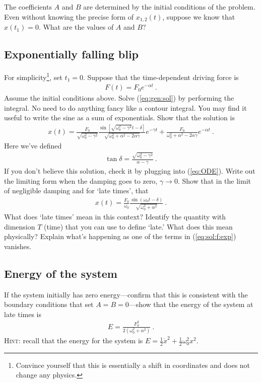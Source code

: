 \documentclass[12pt]{article}
\numberwithin{equation}{subsection}    %
\begin{document}
The coefficients $A$ and $B$ are determined by the initial conditions of the problem. 
%
Even without knowing the precise form of $x_{1,2}(t)$, suppose we know that $x(t_1) = 0$. What are the values of $A$ and $B$?

\subsection{Exponentially falling blip}

For simplicity\footnote{Convince yourself that this is essentially a shift in coordinates and does not change any physics.}, set $t_1 = 0$. Suppose that the time-dependent driving force is
\begin{align}
	F(t) = F_0 e^{-\alpha t} \ .
\end{align}
Assume the initial conditions above. Solve (\ref{eq:gen:sol}) by performing the integral. No need to do anything fancy like a contour integral. You may find it useful to write the sine as a sum of exponentials. Show that the solution is
\begin{align}
	x(t) = \frac{F_0}{\sqrt{\omega_0^2 - \gamma^2}}
	\frac{\sin\left[ \sqrt{\omega_0^2 - \gamma^2} t - \delta \right]}{\sqrt{\omega_0^2 +\alpha^2 - 2\alpha \gamma}}
	e^{-\gamma t}
	+
	\frac{F_0}{\omega_0^2 + \alpha^2 - 2\alpha\gamma} e^{-\alpha t} \ .
	\label{eq:sol:f:exp}
\end{align}
Here we've defined
\begin{align}
	\tan \delta = \frac{\sqrt{\omega_0^2 - \gamma^2}}{\alpha - \gamma} \ .
\end{align}
If you don't believe this solution, check it by plugging into (\ref{eq:ODE}). Write out the limiting form when the damping goes to zero, $\gamma \to 0$. Show that in the limit of negligible damping and for `late times', that
\begin{align}
	x(t) = \frac{F_0}{\omega_0}\frac{\sin (\omega_0 t -\delta)}{\sqrt{\omega_0^2 + \alpha^2}} \ .
\end{align}
What does `late times' mean in this context? Identify the quantity with dimension $T$ (time) that you can use to define `late.' What does this mean physically? Explain what's happening as one of the terms in (\ref{eq:sol:f:exp}) vanishes.

\subsection{Energy of the system}

If the system initially has zero energy---confirm that this is consistent with the boundary conditions that set $A=B=0$---show that the energy of the system at late times is
\begin{align}
	E = \frac{F_0^2}{2(\omega_0^2 + \alpha^2)}\ .
\end{align}
\textsc{Hint}: recall that the energy for the system is $E = \frac 12 \dot x^2 + \frac 12 \omega_0^2 x^2$.


%
%
%
%
%
\end{document}
